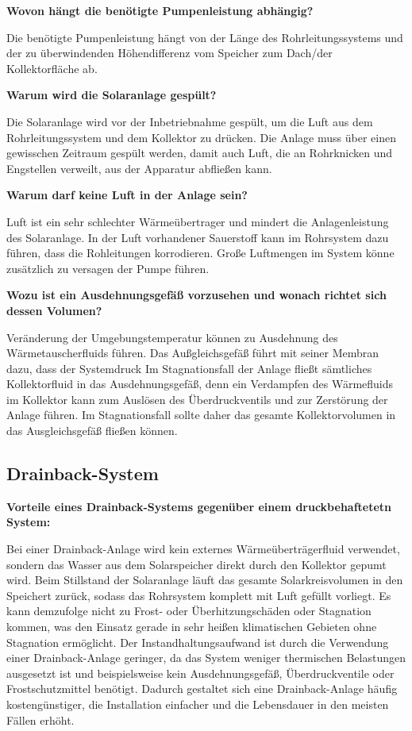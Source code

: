 \textbf{Wovon hängt die benötigte Pumpenleistung abhängig?}

Die benötigte Pumpenleistung hängt von der Länge des Rohrleitungssystems und der zu überwindenden Höhendifferenz vom Speicher zum Dach/der Kollektorfläche ab. 

\textbf{Warum wird die Solaranlage gespült?}

Die Solaranlage wird vor der Inbetriebnahme gespült, um die Luft aus dem Rohrleitungssystem und dem Kollektor zu drücken. Die Anlage muss über einen gewisschen Zeitraum gespült werden, damit auch Luft, die an Rohrknicken und Engstellen verweilt, aus der Apparatur abfließen kann.

\textbf{Warum darf keine Luft in der Anlage sein?}

Luft ist ein sehr schlechter Wärmeübertrager und mindert die Anlagenleistung des Solaranlage. In der Luft vorhandener Sauerstoff kann im Rohrsystem dazu führen, dass die Rohleitungen korrodieren. Große Luftmengen im System könne zusätzlich zu versagen der Pumpe führen. 

\textbf{Wozu ist ein Ausdehnungsgefäß vorzusehen und wonach richtet sich dessen Volumen?}

Veränderung der Umgebungstemperatur können zu Ausdehnung des Wärmetauscherfluids führen. Das Außgleichsgefäß führt mit seiner Membran dazu, dass der Systemdruck Im Stagnationsfall der Anlage fließt sämtliches Kollektorfluid in das Ausdehnungsgefäß, denn ein Verdampfen des Wärmefluids im Kollektor kann zum Auslösen des Überdruckventils und zur Zerstörung der Anlage führen. Im Stagnationsfall sollte daher das gesamte Kollektorvolumen in das Ausgleichsgefäß fließen können.

\subsection{Drainback-System}

\textbf{Vorteile eines Drainback-Systems gegenüber einem druckbehaftetetn System:}

Bei einer Drainback-Anlage wird kein externes Wärmeüberträgerfluid verwendet, sondern das Wasser aus dem Solarspeicher direkt durch den Kollektor gepumt wird. Beim Stillstand der Solaranlage läuft das gesamte Solarkreisvolumen in den Speichert zurück, sodass das Rohrsystem  komplett mit Luft gefüllt vorliegt. Es kann demzufolge nicht zu Frost- oder Überhitzungschäden oder Stagnation kommen, was den Einsatz gerade in sehr heißen klimatischen Gebieten ohne Stagnation ermöglicht. Der Instandhaltungsaufwand ist durch die Verwendung einer Drainback-Anlage geringer, da das System weniger thermischen Belastungen ausgesetzt ist und beispielsweise kein Ausdehnungsgefäß, Überdruckventile oder Frostschutzmittel benötigt. Dadurch gestaltet sich eine Drainback-Anlage häufig kostengünstiger, die Installation einfacher und die Lebensdauer in den meisten Fällen erhöht. \\

